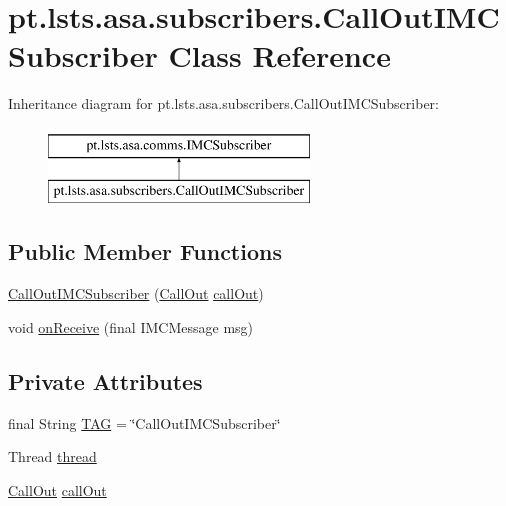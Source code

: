 \hypertarget{classpt_1_1lsts_1_1asa_1_1subscribers_1_1CallOutIMCSubscriber}{}\section{pt.\+lsts.\+asa.\+subscribers.\+Call\+Out\+I\+M\+C\+Subscriber Class Reference}
\label{classpt_1_1lsts_1_1asa_1_1subscribers_1_1CallOutIMCSubscriber}
Inheritance diagram for pt.\+lsts.\+asa.\+subscribers.\+Call\+Out\+I\+M\+C\+Subscriber\+:\begin{figure}[H]
\begin{center}
\leavevmode
\includegraphics[height=2.000000cm]{classpt_1_1lsts_1_1asa_1_1subscribers_1_1CallOutIMCSubscriber}
\end{center}
\end{figure}
\subsection*{Public Member Functions}
\begin{DoxyCompactItemize}
\item 
\hyperlink{classpt_1_1lsts_1_1asa_1_1subscribers_1_1CallOutIMCSubscriber_a91423a66a426471f7eeaae698f4ccf7e}{Call\+Out\+I\+M\+C\+Subscriber} (\hyperlink{classpt_1_1lsts_1_1asa_1_1feedback_1_1CallOut}{Call\+Out} \hyperlink{classpt_1_1lsts_1_1asa_1_1subscribers_1_1CallOutIMCSubscriber_a20e8912cdf6f5dca12b91ec1c52d8694}{call\+Out})
\item 
void \hyperlink{classpt_1_1lsts_1_1asa_1_1subscribers_1_1CallOutIMCSubscriber_a1fd9280b3f17f657bcc7e66c2b242f64}{on\+Receive} (final I\+M\+C\+Message msg)
\end{DoxyCompactItemize}
\subsection*{Private Attributes}
\begin{DoxyCompactItemize}
\item 
final String \hyperlink{classpt_1_1lsts_1_1asa_1_1subscribers_1_1CallOutIMCSubscriber_a2b6c7fc2e5cdeec64fc445027f712ea2}{T\+A\+G} = \char`\"{}Call\+Out\+I\+M\+C\+Subscriber\char`\"{}
\item 
Thread \hyperlink{classpt_1_1lsts_1_1asa_1_1subscribers_1_1CallOutIMCSubscriber_aace2fb8bba8612981525f30239ab194c}{thread}
\item 
\hyperlink{classpt_1_1lsts_1_1asa_1_1feedback_1_1CallOut}{Call\+Out} \hyperlink{classpt_1_1lsts_1_1asa_1_1subscribers_1_1CallOutIMCSubscriber_a20e8912cdf6f5dca12b91ec1c52d8694}{call\+Out}
\end{DoxyCompactItemize}


